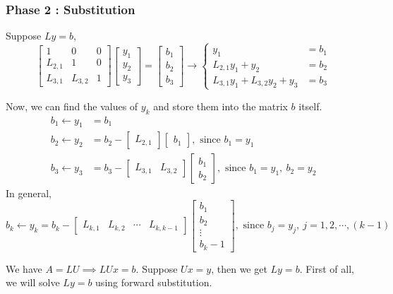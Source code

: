 \subsubsection{Phase 2 : Substitution}
\begin{commentary}
	Suppose $Ly = b$,
	\[ \begin{bmatrix} 1 & 0 &  0 \\ L_{2,1} & 1 & 0 \\ L_{3,1} & L_{3,2} & 1 \end{bmatrix} \begin{bmatrix} y_1 \\ y_2 \\ y_3 \end{bmatrix} = \begin{bmatrix} b_1 \\ b_2 \\ b_3 \end{bmatrix} \to \begin{cases} y_1 & = b_1 \\ L_{2,1}y_1 + y_2 & = b_2 \\ L_{3,1}y_1 + L_{3,2}y_2 + y_3 & = b_3 \end{cases} \]

	Now, we can find the values of $y_k$ and store them into the matrix $b$ itself.
	\begin{align*}
		b_1 \leftarrow y_1 & = b_1 \\
		b_2 \leftarrow y_2 & = b_2 - \begin{bmatrix} L_{2,1} \end{bmatrix} \begin{bmatrix} b_1 \end{bmatrix},\text{ since } b_1 = y_1 \\
			b_3 \leftarrow y_3 & = b_3 - \begin{bmatrix} L_{3,1} & L_{3,2} \end{bmatrix} \begin{bmatrix} b_1 \\ b_2 \end{bmatrix},\text{ since } b_1 = y_1,\ b_2 = y_2
	\end{align*}
	In general,
	\[ b_k \leftarrow y_k = b_k - \begin{bmatrix} L_{k,1} & L_{k,2} & \cdots & L_{k,k-1} \end{bmatrix} \begin{bmatrix} b_1 \\ b_2 \\ \vdots \\ b_k-1 \end{bmatrix},\text{ since } b_j = y_j,\ j = 1,2,\cdots,(k-1) \]
\end{commentary}
	We have $A = LU \implies LUx = b$.
	Suppose $Ux = y$, then we get $Ly = b$.
	First of all, we will solve $Ly = b$ using forward substitution.

